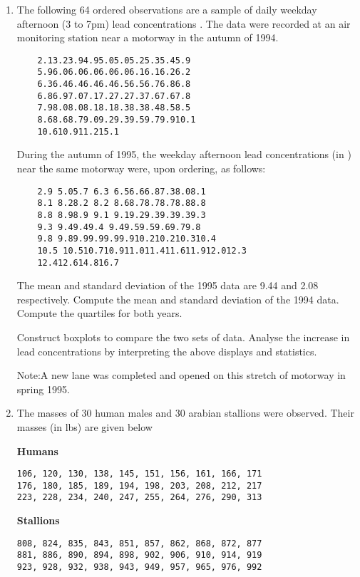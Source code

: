 \documentclass[]{report}
\begin{document}
\begin{enumerate}
\item 
	
The following 64 ordered observations are a sample of daily weekday afternoon      
	(3 to 7pm) lead concentrations  .  The data were recorded at an air 
	monitoring station near a motorway in the autumn of 1994.
	
	\begin{verbatim}
	2.13.23.94.95.05.05.25.35.45.9
	5.96.06.06.06.06.06.16.16.26.2
	6.36.46.46.46.46.56.56.76.86.8
	6.86.97.07.17.27.27.37.67.67.8
	7.98.08.08.18.18.38.38.48.58.5
	8.68.68.79.09.29.39.59.79.910.1
	10.610.911.215.1
	\end{verbatim}
	
	During the autumn of 1995, the weekday afternoon lead concentrations 
	(in  ) near the same motorway were, upon ordering, as follows:
	
	\begin{verbatim}
	2.9 5.05.7 6.3 6.56.66.87.38.08.1
	8.1 8.28.2 8.2 8.68.78.78.78.88.8
	8.8 8.98.9 9.1 9.19.29.39.39.39.3
	9.3 9.49.49.4 9.49.59.59.69.79.8
	9.8 9.89.99.99.99.910.210.210.310.4
	10.5 10.510.710.911.011.411.611.912.012.3
	12.412.614.816.7
	\end{verbatim}
	
	The mean and standard deviation of the 1995 data are 9.44  and 
	2.08  respectively.  Compute the mean and standard deviation of the 
	1994 data.  Compute the quartiles for both years.   
	
	Construct boxplots to compare the two sets of data.  Analyse the increase in
	lead concentrations by interpreting the above displays and statistics.
	
	Note:A new lane was completed and opened on this stretch of motorway
	in spring 1995.
	
\item 
The masses of 30 human males and 30 arabian stallions were observed. 
Their masses (in lbs) are given below

\textbf{Humans}
\begin{verbatim}
106, 120, 130, 138, 145, 151, 156, 161, 166, 171
176, 180, 185, 189, 194, 198, 203, 208, 212, 217
223, 228, 234, 240, 247, 255, 264, 276, 290, 313
\end{verbatim}

\textbf{Stallions}
\begin{verbatim}
808, 824, 835, 843, 851, 857, 862, 868, 872, 877
881, 886, 890, 894, 898, 902, 906, 910, 914, 919
923, 928, 932, 938, 943, 949, 957, 965, 976, 992
\end{verbatim}


\end{enumerate}
\end{document}
